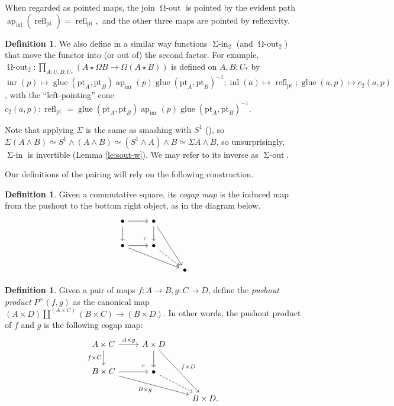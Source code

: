 \documentclass{amsart}
\theoremstyle{definition}
\newtheorem{de}[theorem]{Definition}
\newcommand{\ap}{\operatorname{ap}}
\newcommand{\refl}{\operatorname{refl}}
\newcommand{\inl}{\operatorname{inl}}
\newcommand{\inr}{\operatorname{inr}}
\newcommand{\glue}{\operatorname{glue}}
\newcommand{\depfun}[2]{\prod\limits_{#1}^{}{#2}}
\newcommand{\bs}[1]{\mathrm{pt}_{#1}}
\newcommand{\oout}{\operatorname{\Omega-out}}
\newcommand{\siin}{\operatorname{\Sigma-in}}
\newcommand{\sout}{\operatorname{\Sigma-out}}
\newcommand{\join}{\star}
\begin{document}
When regarded as pointed maps, the join $\oout$ is pointed by the evident path $\ap_{\inl}(\refl_{\bs{}}) = \refl_{\bs{}},$ and the other three maps are pointed by reflexivity.

\begin{de}
    We also define in a similar way functions $\siin_2$ (and $\oout_2$) that move the functor into (or out of) the second factor. For example, $\oout_2: \depfun{A: U, B:U_*}{(A \join \Omega B \to \Omega (A \join B))}$
    is defined on $A, B: U_*$ by  $\inr(p) \mapsto \glue(\bs{A}, \bs{B})\ap_{\inr}(p)\glue(\bs{A}, \bs{B})^{-1}; \inl(a) \mapsto \refl_{\bs{}}; \glue(a, p) \mapsto c_2(a,p)$, with the ``left-pointing'' cone $c_2(a,p): \refl_{\bs{}} = \glue(\bs{A}, \bs{B})\ap_{\inr}(p)\glue(\bs{A}, \bs{B})^{-1}$.
\end{de}

Note that applying $\Sigma$ is the same as smashing with $S^1$ (\cite{Bru}), so $\Sigma (A \wedge B) \simeq S^1 \wedge(A \wedge B) \simeq (S^1 \wedge A) \wedge B \simeq  \Sigma A \wedge B$, so unsurprisingly, $\siin$ is invertible (Lemma \ref{le:sout-w}). We may refer to its inverse as $\sout$.

Our definitions of the pairing will rely on the following construction.
\begin{de}
    Given a commutative square, its \textit{cogap map} is the induced map from the pushout to the bottom right object, as in the diagram below.
    \[\begin{tikzcd}
    	\bullet & \bullet \\
    	\bullet & \bullet \\
    	&& \bullet
    	\arrow[from=1-1, to=1-2]
    	\arrow[from=1-1, to=2-1]
    	\arrow[from=1-2, to=2-2]
    	\arrow[from=1-2, to=3-3]
    	\arrow[from=2-1, to=2-2]
    	\arrow[from=2-1, to=3-3]
    	\arrow["\lrcorner"{anchor=center, pos=0.125, rotate=180}, draw=none, from=2-2, to=1-1]
    	\arrow[dashed, from=2-2, to=3-3]
    \end{tikzcd}\]
\end{de}


\begin{de}
    Given a pair of maps $f: A \to B, g: C \to D$, define the \textit{pushout product} $P^\times(f,g)$ as the canonical map $(A \times D) \coprod^{(A \times C)} (B \times C) \to (B \times D)$. In other words, the pushout product of $f$ and $g$ is the following cogap map:
\[\begin{tikzcd}
	{A \times C} & {A \times D} \\
	{B \times C} & \bullet \\
	&& {B \times D.}
	\arrow["{A \times g}", from=1-1, to=1-2]
	\arrow["{f \times C}"', from=1-1, to=2-1]
	\arrow[from=1-2, to=2-2]
	\arrow["{f \times D}", from=1-2, to=3-3]
	\arrow[from=2-1, to=2-2]
	\arrow["{B \times g}"', from=2-1, to=3-3]
	\arrow["\lrcorner"{anchor=center, pos=0.125, rotate=180}, draw=none, from=2-2, to=1-1]
	\arrow[dashed, from=2-2, to=3-3]
\end{tikzcd}\]

\end{de}
\end{document}
